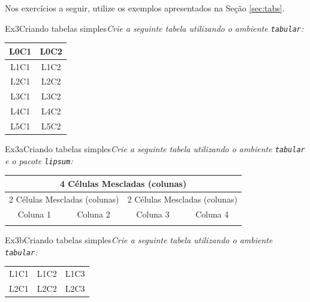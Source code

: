 Nos exercícios a seguir, utilize os exemplos apresentados na Seção \ref{sec:tabs}.

\begin{texercise}{Ex3}{Criando tabelas simples}\textit{Crie a seguinte tabela utilizando o ambiente \texttt{tabular}:}\par\smallskip%
\begin{tcboutputlisting}
\begin{tabular}{c c}
\hline
\textbf{L0C1} & \textbf{L0C2} \\
\hline
L1C1 & L1C2 \\
L2C1 & L2C2 \\
L3C1 & L3C2 \\
L4C1 & L4C2 \\
L5C1 & L5C2 \\
\hline
\end{tabular}
\end{tcboutputlisting}
\tcbuselistingtext%
\end{texercise}

\begin{texercise}{Ex3a}{Criando tabelas simples}\textit{Crie a seguinte tabela utilizando o ambiente \texttt{tabular} e o pacote \texttt{lipsum}:}\par\smallskip%
\begin{tcboutputlisting}
\begin{tabular}{|p{3cm}|p{3cm}|p{3cm}|p{3cm}|}
\hline
\multicolumn{4}{|c|}{4 Células Mescladas (colunas)} \\
\hline
\multicolumn{2}{|c|}{2 Células Mescladas (colunas)} &
\multicolumn{2}{c|}{2 Células Mescladas (colunas)} \\
\hline
\multicolumn{1}{|c|}{Coluna 1} &
\multicolumn{1}{c|}{Coluna 2} &
\multicolumn{1}{c|}{Coluna 3} & \multicolumn{1}{c|}{Coluna 4} \\
\hline
\lipsumsentence[1-2] & \lipsumsentence[3-4] & \lipsumsentence[5-6] &
\lipsumsentence[7-8] \\
\hline
\end{tabular}
\end{tcboutputlisting}
\tcbuselistingtext%
\end{texercise}

\begin{texercise}{Ex3b}{Criando tabelas simples}\textit{Crie a seguinte tabela utilizando o ambiente \texttt{tabular}:}\par\smallskip%
\begin{tcboutputlisting}
\begin{tabular}{|l|c|r|}
\hline
L1C1 & L1C2 & L1C3 \\
L2C1 & L2C2 & L2C3 \\
\hline
\end{tabular}
\end{tcboutputlisting}
\tcbuselistingtext%
\end{texercise}


